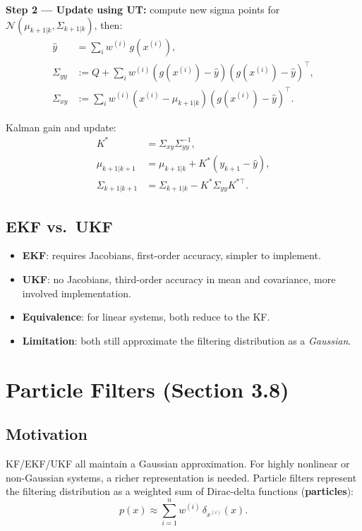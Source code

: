 \documentclass[12pt, a4paper]{article}
\begin{document}
\textbf{Step 2 --- Update using UT:} compute new sigma points for
$\mathcal{N}(\mu_{k+1|k},\Sigma_{k+1|k})$, then:
\begin{align}
  \hat{y} &= \sum_{i}w^{(i)}\,g(x^{(i)}), \\
  \Sigma_{yy} &:= Q + \sum_i w^{(i)}(g(x^{(i)})-\hat{y})(g(x^{(i)})-\hat{y})^\top, \\
  \Sigma_{xy} &:= \sum_i w^{(i)}(x^{(i)}-\mu_{k+1|k})(g(x^{(i)})-\hat{y})^\top.
\end{align}

Kalman gain and update:
\begin{align}
  K^* &= \Sigma_{xy}\Sigma_{yy}^{-1}, \\
  \mu_{k+1|k+1} &= \mu_{k+1|k} + K^*(y_{k+1}-\hat{y}), \\
  \Sigma_{k+1|k+1} &= \Sigma_{k+1|k} - K^*\Sigma_{yy}K^{*\top}.
\end{align}

\subsection{EKF vs.\ UKF}

\begin{itemize}
  \item \textbf{EKF}: requires Jacobians, first-order accuracy,
    simpler to implement.
  \item \textbf{UKF}: no Jacobians, third-order accuracy in mean and
    covariance, more involved implementation.
  \item \textbf{Equivalence}: for linear systems, both reduce to the KF.
  \item \textbf{Limitation}: both still approximate the filtering
    distribution as a \emph{Gaussian}.
\end{itemize}

\section{Particle Filters (Section 3.8)}

\subsection{Motivation}

KF/EKF/UKF all maintain a Gaussian approximation. For highly nonlinear
or non-Gaussian systems, a richer representation is needed. Particle
filters represent the filtering distribution as a weighted sum of
Dirac-delta functions (\textbf{particles}):
\begin{equation}
  p(x) \approx \sum_{i=1}^{n} w^{(i)}\,\delta_{x^{(i)}}(x).
\end{equation}
\end{document}
